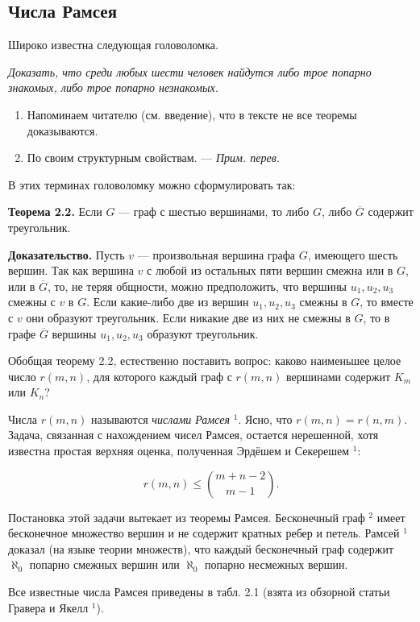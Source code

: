 \subsection{Числа Рамсея}
Широко известна следующая головоломка.

\textit{Доказать, что среди любых шести человек найдутся либо трое попарно знакомых, либо трое попарно незнакомых.}

\begin{enumerate}
    \item Напоминаем читателю (см. введение), что в тексте не все теоремы доказываются.
    \item По своим структурным свойствам. — \textit{Прим. перев.}
\end{enumerate}

В этих терминах головоломку можно сформулировать так:

\textbf{Теорема 2.2.} Если \( G \) — граф с шестью вершинами, то либо \( G \), либо \( \overline{G} \) содержит треугольник.

\textbf{Доказательство.} Пусть \( v \) — произвольная вершина графа \( G \), имеющего шесть вершин. Так как вершина \( v \) с любой из остальных пяти вершин смежна или в \( G \), или в \( \overline{G} \), то, не теряя общности, можно предположить, что вершины \( u_1, u_2, u_3 \) смежны с \( v \) в \( G \). Если какие-либо две из вершин \( u_1, u_2, u_3 \) смежны в \( G \), то вместе с \( v \) они образуют треугольник. Если никакие две из них не смежны в \( G \), то в графе \( \overline{G} \) вершины \( u_1, u_2, u_3 \) образуют треугольник.

Обобщая теорему 2.2, естественно поставить вопрос: каково наименьшее целое число \( r(m, n) \), для которого каждый граф с \( r(m, n) \) вершинами содержит \( K_m \) или \( K_n \)?

Числа \( r(m, n) \) называются \textit{числами Рамсея} \(^1\). Ясно, что \( r(m, n) = r(n, m) \). Задача, связанная с нахождением чисел Рамсея, остается нерешенной, хотя известна простая верхняя оценка, полученная Эрдёшем и Секерешем \(^1\):

\begin{equation}
r(m, n) \leq \binom{m + n - 2}{m - 1}.
\end{equation}

Постановка этой задачи вытекает из теоремы Рамсея. Бесконечный граф \(^2\) имеет бесконечное множество вершин и не содержит кратных ребер и петель. Рамсей \(^1\) доказал (на языке теории множеств), что каждый бесконечный граф содержит \( \aleph_0 \) попарно смежных вершин или \( \aleph_0 \) попарно несмежных вершин.

Все известные числа Рамсея приведены в табл. 2.1 (взята из обзорной статьи Гравера и Якелл \(^1\)).
